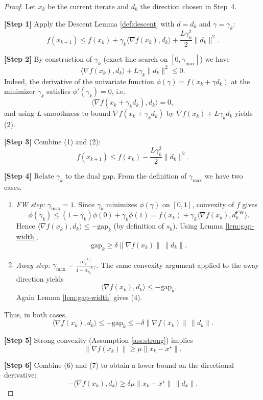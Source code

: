 \documentclass{article}
\newcommand{\gap}{\mathrm{gap}}
\begin{document}
\begin{proof}
Let $x_k$ be the current iterate and $d_k$ the direction chosen in Step~4.  

\textbf{[Step 1]} Apply the Descent Lemma \eqref{def:descent} with $d=d_k$ and $\gamma=\gamma_k$:
\[
f(x_{k+1})\le f(x_k)+\gamma_k\langle\nabla f(x_k),d_k\rangle
               +\frac{L\gamma_k^{2}}{2}\|d_k\|^{2}.
\tag{1}
\]

\textbf{[Step 2]} By construction of $\gamma_k$ (exact line search on $[0,\gamma_{\max}]$) we have
\[
\langle\nabla f(x_k),d_k\rangle+\!L\gamma_k\|d_k\|^{2}\le 0 .
\tag{2}
\]
Indeed, the derivative of the univariate function $\phi(\gamma)=f(x_k+\gamma d_k)$ at the minimizer $\gamma_k$ satisfies $\phi'(\gamma_k)=0$, i.e.
\[
\langle\nabla f(x_k+\gamma_k d_k),d_k\rangle=0,
\]
and using $L$‑smoothness to bound $\nabla f(x_k+\gamma_k d_k)$ by $\nabla f(x_k)+L\gamma_k d_k$ yields (2).  

\textbf{[Step 3]} Combine (1) and (2):
\[
f(x_{k+1})\le f(x_k)-\frac{L\gamma_k^{2}}{2}\|d_k\|^{2}.
\tag{3}
\]

\textbf{[Step 4]} Relate $\gamma_k$ to the dual gap.  
From the definition of $\gamma_{\max}$ we have two cases.

\begin{enumerate}[label=(\alph*)]
\item \emph{FW step:} $\gamma_{\max}=1$. Since $\gamma_k$ minimizes $\phi(\gamma)$ on $[0,1]$, convexity of $f$ gives
\[
\phi(\gamma_k)\le (1-\gamma_k)\phi(0)+\gamma_k\phi(1)
               = f(x_k)+\gamma_k\langle\nabla f(x_k),d^{\text{FW}}_k\rangle .
\]
Hence $\langle\nabla f(x_k),d_k\rangle\le -\gap_k$ (by definition of $s_k$). Using Lemma \ref{lem:gap-width},
\[
\gap_k\ge\delta\|\nabla f(x_k)\|\,\|d_k\|.
\tag{4}
\]

\item \emph{Away step:} $\gamma_{\max}=\frac{\alpha^{(k)}_{v_k}}{1-\alpha^{(k)}_{v_k}}$.  
The same convexity argument applied to the away direction yields
\[
\langle\nabla f(x_k),d_k\rangle\le -\gap_k .
\tag{5}
\]
Again Lemma \ref{lem:gap-width} gives (4).
\end{enumerate}

Thus, in both cases,
\[
\langle\nabla f(x_k),d_k\rangle\le -\gap_k\le -\delta\|\nabla f(x_k)\|\,\|d_k\|.
\tag{6}
\]

\textbf{[Step 5]} Strong convexity (Assumption \ref{ass:strong}) implies
\[
\|\nabla f(x_k)\|\ge \mu\|x_k-x^\star\|.
\tag{7}
\]

\textbf{[Step 6]} Combine (6) and (7) to obtain a lower bound on the directional derivative:
\[
-\langle\nabla f(x_k),d_k\rangle\ge \delta\mu\|x_k-x^\star\|\,\|d_k\|.
\tag{8}
\]


\end{proof}
\end{document}
